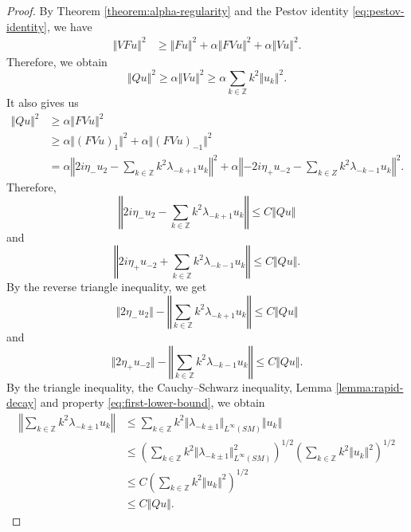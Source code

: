 \documentclass[reqno,12pt,letterpaper]{amsart}
\theoremstyle{definition}
\theoremstyle{remark}
\theoremstyle{definition}
\numberwithin{equation}{section}
\newcommand{\Z}{\mathbb{Z}}
\begin{document}
\begin{proof}
By Theorem \ref{theorem:alpha-regularity} and the Pestov identity \eqref{eq:pestov-identity}, we have
\begin{equation*}
\begin{alignedat}{1}
\Vert VF u\Vert^2 &\geq \Vert Fu\Vert^2+\alpha \Vert FVu \Vert^2+\alpha\Vert Vu\Vert^2.
\end{alignedat}
\end{equation*}
Therefore, we obtain
\begin{equation}\label{eq:first-lower-bound}
\Vert Qu\Vert^2\geq \alpha \Vert Vu\Vert^2\geq \alpha \sum_{k\in \Z}k^2\Vert u_k\Vert^2.
\end{equation}
It also gives us
\begin{equation*}
\begin{alignedat}{1}
\Vert Q u \Vert^2&\geq \alpha \Vert F V u \Vert^2\\
&\geq  \alpha \Vert( F V u)_{1} \Vert^2+  \alpha \Vert( F V u)_{-1} \Vert^2\\
&=\alpha \left\Vert 2i\eta_-u_2-\sum_{k\in \Z}k^2\lambda_{-k+1} u_{k}\right\Vert^2+\alpha\left\Vert -2i \eta_+u_{-2}-\sum_{k\in Z}k^2\lambda_{-k-1} u_{k}\right\Vert^2.
\end{alignedat}
\end{equation*}
Therefore,
$$\left\Vert 2i\eta_- u_{2}- \sum_{k\in \Z}k^2\lambda_{-k+ 1} u_{k}\right\Vert\leq C \Vert Qu\Vert$$
and 
$$\left\Vert 2i \eta_+u_{-2}+\sum_{k\in \Z}k^2\lambda_{-k-1} u_{k}\right\Vert\leq C\Vert Qu\Vert.$$
By the reverse triangle inequality, we get
$$\Vert 2\eta_-u_2\Vert - \left\Vert\sum_{k\in \Z }k^2\lambda_{-k+1}  u_{k}\right\Vert\leq C \Vert Qu\Vert$$
and 
$$\Vert 2 \eta_+u_{-2}\Vert-\left\Vert\sum_{k\in \Z }k^2\lambda_{-k-1} u_{k}\right\Vert\leq C\Vert Qu\Vert.$$
By the triangle inequality, the Cauchy--Schwarz inequality, Lemma \ref{lemma:rapid-decay} and property \eqref{eq:first-lower-bound}, we obtain
\begin{equation*}
\begin{alignedat}{1}
\left\Vert\sum_{k\in \Z}k^2\lambda_{-k\pm 1}u_k \right\Vert & \leq \sum_{k\in \Z}k^2\Vert \lambda_{-k\pm 1}\Vert_{L^\infty(SM)} \Vert u_k\Vert\\
&\leq \left( \sum_{k\in \Z} k^2\Vert \lambda_{-k\pm 1}\Vert_{L^\infty(SM)}^2\right)^{1/2}\left( \sum_{k\in \Z} k^2\Vert u_{k}\Vert^2 \right)^{1/2}\\
&\leq C \left( \sum_{k\in \Z} k^2\Vert u_{k}\Vert^2 \right)^{1/2}\\
&\leq C \Vert Q u \Vert. 
\end{alignedat}

\end{equation*}
\end{proof}
\end{document}

